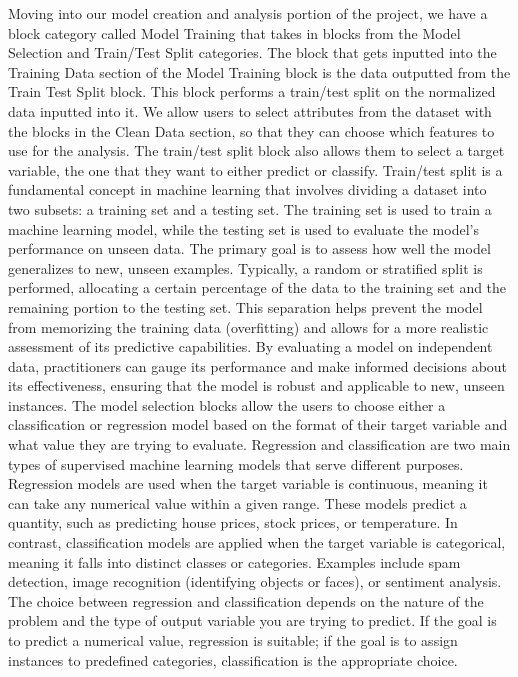 \documentclass{article}
\theoremstyle{theorem}
\theoremstyle{definition}
\theoremstyle{remark}
\begin{document}
Moving into our model creation and analysis portion of the project, we have a block category called Model Training that takes in blocks from the Model Selection and Train/Test Split categories. The block that gets inputted into the Training Data section of the Model Training block is the data outputted from the Train Test Split block. This block performs a train/test split on the normalized data inputted into it. We allow users to select attributes from the dataset with the blocks in the Clean Data section, so that they can choose which features to use for the analysis. The train/test split block also allows them to select a target variable, the one that they want to either predict or classify. Train/test split is a fundamental concept in machine learning that involves dividing a dataset into two subsets: a training set and a testing set. The training set is used to train a machine learning model, while the testing set is used to evaluate the model's performance on unseen data. The primary goal is to assess how well the model generalizes to new, unseen examples. Typically, a random or stratified split is performed, allocating a certain percentage of the data to the training set and the remaining portion to the testing set. This separation helps prevent the model from memorizing the training data (overfitting) and allows for a more realistic assessment of its predictive capabilities. By evaluating a model on independent data, practitioners can gauge its performance and make informed decisions about its effectiveness, ensuring that the model is robust and applicable to new, unseen instances. The model selection blocks allow the users to choose either a classification or regression model based on the format of their target variable and what value they are trying to evaluate. Regression and classification are two main types of supervised machine learning models that serve different purposes. Regression models are used when the target variable is continuous, meaning it can take any numerical value within a given range. These models predict a quantity, such as predicting house prices, stock prices, or temperature. In contrast, classification models are applied when the target variable is categorical, meaning it falls into distinct classes or categories. Examples include spam detection, image recognition (identifying objects or faces), or sentiment analysis. The choice between regression and classification depends on the nature of the problem and the type of output variable you are trying to predict. If the goal is to predict a numerical value, regression is suitable; if the goal is to assign instances to predefined categories, classification is the appropriate choice.
\end{document}
